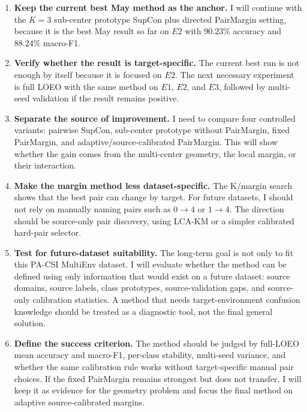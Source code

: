 \documentclass[11pt]{article}
\begin{document}
\begin{enumerate}[leftmargin=*]
    \item \textbf{Keep the current best May method as the anchor.} I will continue with the $K=3$ sub-center prototype SupCon plus directed PairMargin setting, because it is the best May result so far on $E2$ with $90.23\%$ accuracy and $88.24\%$ macro-F1.

    \item \textbf{Verify whether the result is target-specific.} The current best run is not enough by itself because it is focused on $E2$. The next necessary experiment is full LOEO with the same method on $E1$, $E2$, and $E3$, followed by multi-seed validation if the result remains positive.

    \item \textbf{Separate the source of improvement.} I need to compare four controlled variants: pairwise SupCon, sub-center prototype without PairMargin, fixed PairMargin, and adaptive/source-calibrated PairMargin. This will show whether the gain comes from the multi-center geometry, the local margin, or their interaction.

    \item \textbf{Make the margin method less dataset-specific.} The K/margin search shows that the best pair can change by target. For future datasets, I should not rely on manually naming pairs such as $0{\rightarrow}4$ or $1{\rightarrow}4$. The direction should be source-only pair discovery, using LCA-KM or a simpler calibrated hard-pair selector.

    \item \textbf{Test for future-dataset suitability.} The long-term goal is not only to fit this PA-CSI MultiEnv dataset. I will evaluate whether the method can be defined using only information that would exist on a future dataset: source domains, source labels, class prototypes, source-validation gaps, and source-only calibration statistics. A method that needs target-environment confusion knowledge should be treated as a diagnostic tool, not the final general solution.

    \item \textbf{Define the success criterion.} The method should be judged by full-LOEO mean accuracy and macro-F1, per-class stability, multi-seed variance, and whether the same calibration rule works without target-specific manual pair choices. If the fixed PairMargin remains strongest but does not transfer, I will keep it as evidence for the geometry problem and focus the final method on adaptive source-calibrated margins.
\end{enumerate}
\end{document}
